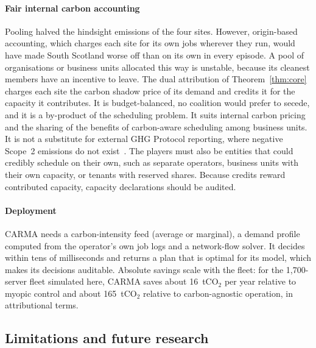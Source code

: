 \paragraph{Fair internal carbon accounting} Pooling halved the hindsight emissions of the four sites. However, origin-based accounting, which charges each site for its own jobs wherever they run, would have made South Scotland worse off than on its own in every episode. A pool of organisations or business units allocated this way is unstable, because its cleanest members have an incentive to leave. The dual attribution of Theorem~\ref{thm:core} charges each site the carbon shadow price of its demand and credits it for the capacity it contributes. It is budget-balanced, no coalition would prefer to secede, and it is a by-product of the scheduling problem. It suits internal carbon pricing and the sharing of the benefits of carbon-aware scheduling among business units. It is not a substitute for external GHG Protocol reporting, where negative Scope~2 emissions do not exist~\cite{ghg2015scope2}. The players must also be entities that could credibly schedule on their own, such as separate operators, business units with their own capacity, or tenants with reserved shares. Because credits reward contributed capacity, capacity declarations should be audited.

\paragraph{Deployment} CARMA needs a carbon-intensity feed (average or marginal), a demand profile computed from the operator's own job logs and a network-flow solver. It decides within tens of milliseconds and returns a plan that is optimal for its model, which makes its decisions auditable. Absolute savings scale with the fleet: for the 1{,}700-server fleet simulated here, CARMA saves about 16~tCO$_2$ per year relative to myopic control and about 165~tCO$_2$ relative to carbon-agnostic operation, in attributional terms.

\subsection{Limitations and future research}

